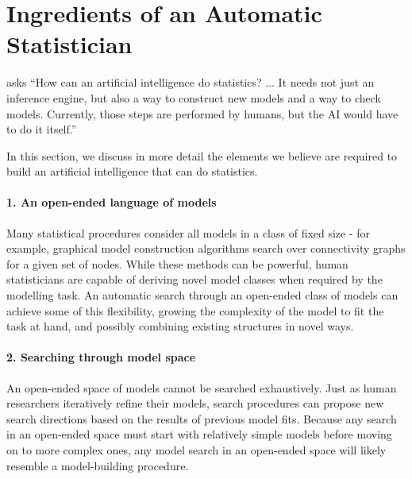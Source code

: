 \section{Ingredients of an Automatic Statistician}
\label{sec:ingredients}
\citet{gelman2013philblogpost} asks ``How can an artificial intelligence do statistics? ... It needs not just an inference engine, but also a way to construct new models and a way to check models. Currently, those steps are performed by humans, but the AI would have to do it itself.''


In this section, we discuss in more detail the elements we believe are required to build an artificial intelligence that can do statistics.

\paragraph{1. An open-ended language of models}
Many statistical procedures consider all models in a class of fixed size - for example, graphical model construction algorithms search over connectivity graphs for a given set of nodes.
While these methods can be powerful, human statisticians are capable of deriving novel model classes when required by the modelling task.
An automatic search through an open-ended class of models can achieve some of this flexibility, growing the complexity of the model to fit the task at hand, and possibly combining existing structures in novel ways.

\paragraph{2. Searching through model space}
An open-ended space of models cannot be searched exhaustively.
Just as human researchers iteratively refine their models, search procedures can propose new search directions based on the results of previous model fits.
Because any search in an open-ended space must start with relatively simple models before moving on to more complex ones, any model search in an open-ended space will likely resemble a model-building procedure.%

